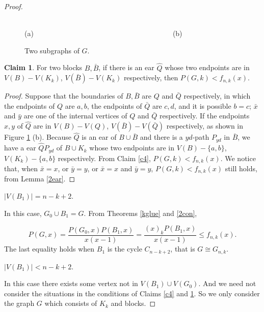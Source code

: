 \documentclass[12pt]{article}
\theoremstyle{definition}
\newtheorem{claim}{Claim}
\begin{document}
\begin{proof}
\begin{figure}[h]
\begin{center}
\\ (a)~~~~~~~~~~~~~~~~~~~~~~~~~~~~~~~~~~~~~~~(b)
\caption{Two subgraphs of  $G$.}
\label{fig3}
\end{center}
\end{figure}


\begin{claim}\label{c3} For two blocks $B, \bar{B}$, if there is an ear $\hat{Q}$  whose two endpoints are in $V(B)-V(K_k)$, $V(\bar{B})-V(K_k)$ respectively, then $P(G,k)<f_{n,k}(x)$.
\end{claim}

\begin{proof} Suppose that the boundaries of $B, \bar{B}$ are $Q$ and $\bar{Q}$ respectively, in which the endpoints of $Q$ are $a,b$, the endpoints of $\bar{Q}$ are $c,d$, and it is possible $b=c$; $\bar{x}$ and $\bar{y}$ are one of the internal vertices of $Q$ and $\bar{Q}$ respectively.
If the  endpoints $x, y$ of $\hat{Q}$ are in $V(B)-V(Q)$, $V(\bar{B})-V(\bar{Q})$ respectively, as shown in Figure \ref{fig3} (b).
Because $\hat{Q}$ is an ear of $B\cup\bar{B}$ and there is a $yd$-path $P_{yd}$ in $\bar{B}$, we have a ear $\hat{Q}P_{yd}$ of $B\cup K_k$ whose two endpoints are in $V(B)-\{a,b\}$, $V(K_k)-\{a,b\}$ respectively. From Claim \ref{c4}, $P(G,k)<f_{n,k}(x)$. We notice that, when $\bar{x}=x$, or $\bar{y}=y$, or $\bar{x}=x$ and $\bar{y}=y$, $P(G,k)<f_{n,k}(x)$ still holds, from Lemma \ref{2ear}.
\end{proof}



 $|V(B_1)|=n-k+2$.

In this case, $G_0\cup B_1=G$. %
From Theorems \ref{kglue} and \ref{2con},

$$P(G,x)=\frac{P(G_0,x)P(B_1,x)}{x(x-1)}=\frac{(x)_kP(B_1,x)}{x(x-1)}\leq f_{n,k}(x).$$
The last equality holds when $B_1$ is the cycle $C_{n-k+2}$, that is  $G\cong G_{n,k}$.


 $|V(B_1)|< n-k+2$.

In this case there exists some vertex not in $V(B_1)\cup V(G_0)$. And we need not consider the situations in the conditions of Claims \ref{c4} and \ref{c3}. So we only consider the graph $G$ which consists of $K_k$ and blocks.


\end{proof}
\end{document}
